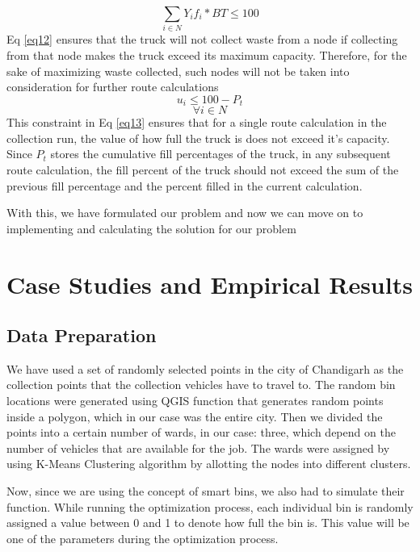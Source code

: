 \documentclass[12pt]{article}
\begin{document}
\begin{equation}\label{eq12}
    \sum_{i\in N}Y_i f_i* BT\le100
\end{equation}
Eq \eqref{eq12} ensures that the truck will not collect waste from a node if collecting from that node makes the truck exceed its maximum capacity. Therefore, for the sake of maximizing waste collected, such nodes will not be taken into consideration for further route calculations
\begin{equation}\label{eq13}
    u_i\le 100 - P_t
\end{equation}
$$\forall i \in N $$
This constraint in Eq \eqref{eq13} ensures that for a single route calculation in the collection run, the value of how full the truck is does not exceed it's capacity. Since $P_t$ stores the cumulative fill percentages of the truck, in any subsequent route calculation, the fill percent of the truck should not exceed the sum of the previous fill percentage and the percent filled in the current calculation. 

With this, we have formulated our problem and now we can move on to implementing and calculating the solution for our problem

\section{Case Studies and Empirical Results}

\subsection{Data Preparation}

We have used a set of randomly selected points in the city of Chandigarh as the collection points that the collection vehicles have to travel to. The random bin locations were generated using QGIS function that generates random points inside a polygon, which in our case was the entire city. Then we divided the points into a certain number of wards, in our case: three, which depend on the number of vehicles that are available for the job. The wards were assigned by using K-Means Clustering algorithm by allotting the nodes into different clusters.

Now, since we are using the concept of smart bins, we also had to simulate their function. While running the optimization process, each individual bin is randomly assigned a value between 0 and 1 to denote how full the bin is. This value will be one of the parameters during the optimization process.
\end{document}
